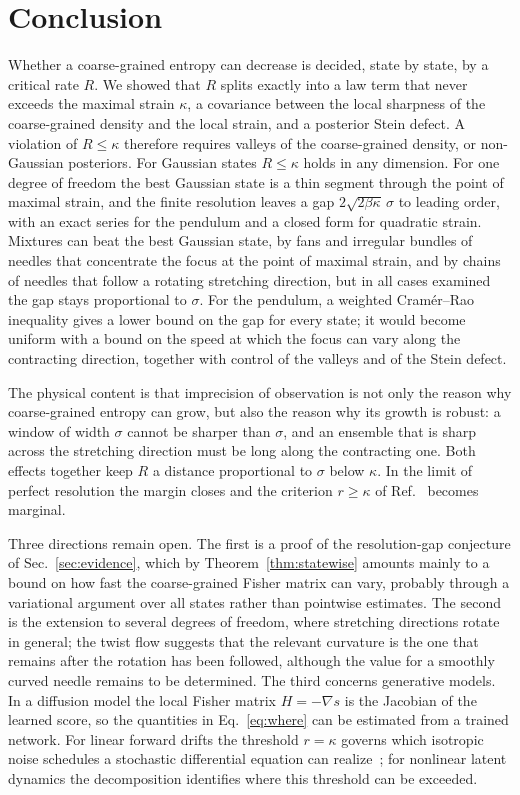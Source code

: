 \section{Conclusion}
\label{sec:conclusion}

Whether a coarse-grained entropy can decrease is decided, state by state, by a critical rate $R$. We showed that $R$ splits exactly into a law term that never exceeds the maximal strain $\kappa$, a covariance between the local sharpness of the coarse-grained density and the local strain, and a posterior Stein defect. A violation of $R \leq \kappa$ therefore requires valleys of the coarse-grained density, or non-Gaussian posteriors. For Gaussian states $R \leq \kappa$ holds in any dimension. For one degree of freedom the best Gaussian state is a thin segment through the point of maximal strain, and the finite resolution leaves a gap $2\sqrt{2\beta\kappa}\,\sigma$ to leading order, with an exact series for the pendulum and a closed form for quadratic strain. Mixtures can beat the best Gaussian state, by fans and irregular bundles of needles that concentrate the focus at the point of maximal strain, and by chains of needles that follow a rotating stretching direction, but in all cases examined the gap stays proportional to $\sigma$. For the pendulum, a weighted Cram\'er--Rao inequality gives a lower bound on the gap for every state; it would become uniform with a bound on the speed at which the focus can vary along the contracting direction, together with control of the valleys and of the Stein defect.

The physical content is that imprecision of observation is not only the reason why coarse-grained entropy can grow, but also the reason why its growth is robust: a window of width $\sigma$ cannot be sharper than $\sigma$, and an ensemble that is sharp across the stretching direction must be long along the contracting one. Both effects together keep $R$ a distance proportional to $\sigma$ below $\kappa$. In the limit of perfect resolution the margin closes and the criterion $r \geq \kappa$ of Ref.~\cite{namba2026arrow} becomes marginal.

Three directions remain open. The first is a proof of the resolution-gap conjecture of Sec.~\ref{sec:evidence}, which by Theorem~\ref{thm:statewise} amounts mainly to a bound on how fast the coarse-grained Fisher matrix can vary, probably through a variational argument over all states rather than pointwise estimates. The second is the extension to several degrees of freedom, where stretching directions rotate in general; the twist flow suggests that the relevant curvature is the one that remains after the rotation has been followed, although the value for a smoothly curved needle remains to be determined. The third concerns generative models. In a diffusion model the local Fisher matrix $H = -\nabla s$ is the Jacobian of the learned score, so the quantities in Eq.~\eqref{eq:where} can be estimated from a trained network. For linear forward drifts the threshold $r = \kappa$ governs which isotropic noise schedules a stochastic differential equation can realize~\cite{namba2026arrow,namba2026threshold}; for nonlinear latent dynamics the decomposition identifies where this threshold can be exceeded.
